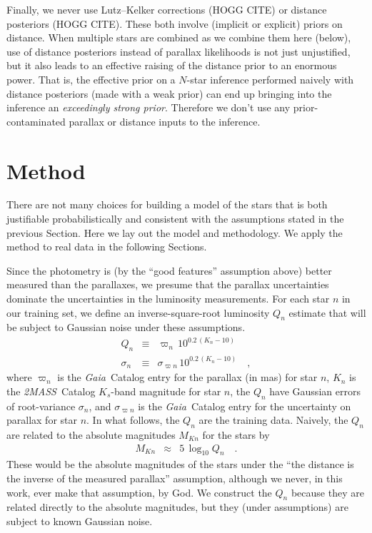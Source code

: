 \documentclass[modern]{aastex62}
\newcommand{\acronym}[1]{{\small{#1}}}
\newcommand{\project}[1]{\textsl{#1}}
\newcommand{\gaia}{\project{Gaia}}
\newcommand{\zmass}{\project{\acronym{2MASS}}}
\begin{document}
Finally, we never use Lutz--Kelker corrections (HOGG CITE) or distance
posteriors (HOGG CITE). These both involve (implicit or explicit) priors on 
distance.
When multiple stars are combined as we combine them here (below),
use of distance posteriors instead of parallax likelihoods is not just
unjustified, but it also leads to an
effective raising of the distance prior to an enormous power.
That is, the effective prior on a $N$-star inference performed naively
with distance posteriors (made with a weak prior) can end up
bringing into the inference an \emph{exceedingly
strong prior}.
Therefore we don't use any prior-contaminated parallax or distance
inputs to the inference.

\section{Method}

There are not many choices
for building a model of the stars that is both justifiable probabilistically
and consistent with the assumptions stated in the previous Section.
Here we lay out the model and methodology.
We apply the method to real data in the following Sections.

Since the photometry is (by the ``good features'' assumption above)
better measured than the parallaxes, we
presume that the parallax uncertainties dominate
the uncertainties in the luminosity measurements.
For each star $n$ in our training set, we define an inverse-square-root
luminosity $Q_n$ estimate that will be subject to Gaussian noise under these assumptions.
\begin{eqnarray}
Q_n &\equiv& \varpi_n\,10^{0.2\,(K_n - 10)}
\\
\sigma_n &\equiv& \sigma_{\varpi n}\,10^{0.2\,(K_n - 10)}
\quad,
\end{eqnarray}
where
$\varpi_n$ is the \gaia\ Catalog entry for the parallax (in mas) for star $n$,
$K_n$ is the \zmass\ Catalog $K_s$-band magnitude for star $n$,
the $Q_n$ have Gaussian errors of root-variance $\sigma_n$,
and $\sigma_{\varpi n}$ is the \gaia\ Catalog entry for the uncertainty on parallax
for star $n$.
In what follows, the $Q_n$ are the training data.
Naively, the $Q_n$ are related to the absolute magnitudes $M_{Kn}$ for the stars by
\begin{eqnarray}
M_{Kn} &\approx& 5\,\log_{10} Q_n
\quad.
\end{eqnarray}
These would be the absolute magnitudes of the stars under the
``the distance is the inverse of the
measured parallax'' assumption, although we never, in this work, ever make that
assumption, by God.
We construct the $Q_n$ because they are related directly to the absolute magnitudes,
but they (under assumptions) are subject to known Gaussian noise.
\end{document}
